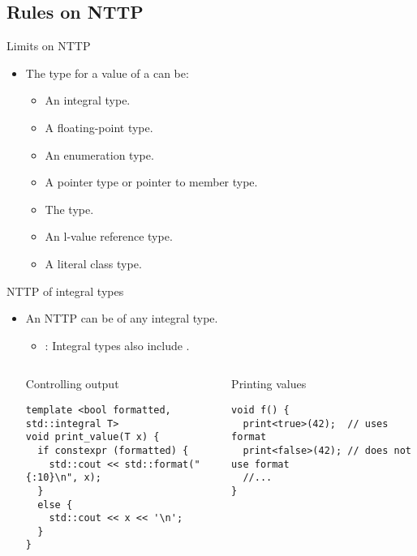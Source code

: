 \subsection{Rules on NTTP}

\begin{frame}[t,fragile]{Limits on NTTP}
\begin{itemize}
  \item The type for a value of a  can be:
    \begin{itemize}
      \item An integral type.
      \item A floating-point type.
      \item An enumeration type.
      \item A pointer type or pointer to member type.
      \item The  type.
      \item An l-value reference type.
      \item A literal class type.
    \end{itemize}
\end{itemize}
\end{frame}

\begin{frame}[t,fragile]{NTTP of integral types}
\begin{itemize}
  \item An NTTP can be of any integral type.
    \begin{itemize}
      \item {}: Integral types also include .
    \end{itemize}

\begin{columns}[T]

\begin{block}{Controlling output}
\begin{lstlisting}
template <bool formatted, std::integral T>
void print_value(T x) {
  if constexpr (formatted) {
    std::cout << std::format("{:10}\n", x);
  }
  else {
    std::cout << x << '\n';
  }
}
\end{lstlisting}
\end{block}

\begin{block}{Printing values}
\begin{lstlisting}
void f() {
  print<true>(42);  // uses format
  print<false>(42); // does not use format
  //...
}
\end{lstlisting}
\end{block}

\end{columns}

\end{itemize}
\end{frame}


